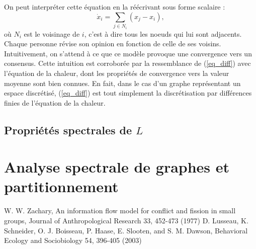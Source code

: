 \documentclass[12pt]{article}
\begin{document}
On peut interpréter cette équation en la réécrivant sous forme scalaire :
\begin{equation}
  \label{eq_diff_scal}
  \dot {x}_i = \sum_{j \in N_i} (x_j - x_i),
\end{equation}
où $N_i$ est le voisinage de $i$, c'est à dire tous les noeuds
qui lui sont adjacents. Chaque personne révise son opinion en
fonction de celle de ses voisins. Intuitivement, on s'attend à
ce que ce modèle provoque une convergence vers un
consensus. Cette intuition est corroborée par la ressemblance de
(\ref{eq_diff}) avec l'équation de la chaleur, dont les
propriétés de convergence vers la valeur moyenne sont bien
connues. En fait, dans le cas d'un graphe représentant un espace
discrétisé, (\ref{eq_diff}) est tout simplement la
discrétisation par différences finies de l'équation de la
chaleur.

\subsection{Propriétés spectrales de $L$}
\section{Analyse spectrale de graphes et partitionnement}

\begin{thebibliography}{2}
 W. W. Zachary, An information flow model for conflict and fission in small groups, Journal of Anthropological Research 33, 452-473 (1977)
 D. Lusseau, K. Schneider, O. J. Boisseau, P. Haase, E. Slooten, and S. M. Dawson, Behavioral Ecology and Sociobiology 54, 396-405 (2003)
\end{thebibliography}
\end{document}
